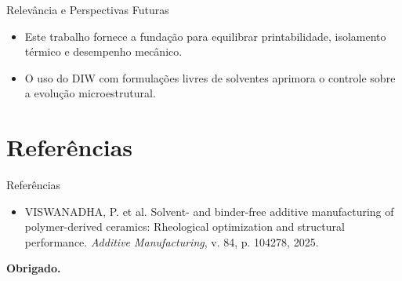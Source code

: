\documentclass{beamer}
\begin{document}
	\begin{frame}{Relevância e Perspectivas Futuras}
		\begin{itemize}
			\item Este trabalho fornece a fundação para equilibrar printabilidade, isolamento térmico e desempenho mecânico.
			\item O uso do DIW com formulações livres de solventes aprimora o controle sobre a evolução microestrutural.
		\end{itemize}
	\end{frame}
	
	\section{Referências}
	
	\begin{frame}{Referências}
		
		\begin{itemize}
			\item VISWANADHA, P. et al. Solvent- and binder-free additive manufacturing of polymer-derived ceramics: Rheological optimization and structural performance. \textit{Additive Manufacturing}, v. 84, p. 104278, 2025.
		\end{itemize}
		
	\end{frame}
	
	\begin{frame}
		\vfill
		\centering
		\textbf{\Huge Obrigado.}
		\vfill
	\end{frame}
	
\end{document}
